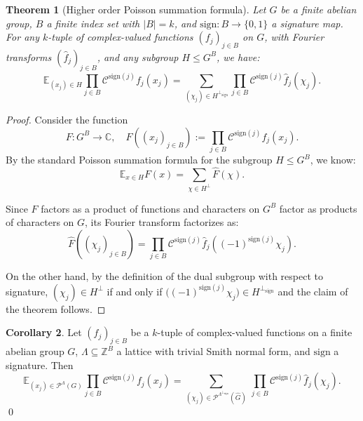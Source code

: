 \documentclass{amsart}
\newtheorem{theorem}{Theorem}[section]
\theoremstyle{definition}
\newtheorem{corollary}[theorem]{Corollary}
\theoremstyle{remark}
\numberwithin{equation}{section}
\begin{document}
\begin{theorem}[Higher order Poisson summation formula]
\label{thm:Poisson}
Let $G$ be a finite abelian group, $B$ a finite index set with $|B|=k$, and $\mathrm{sign}: B \to \{0,1\}$ a signature map. For any $k$-tuple of complex-valued functions $(f_j)_{j \in B}$ on $G$, with Fourier transforms $(\widehat{f}_j)_{j \in B}$, and any subgroup $H \leq G^B$, we have:
\begin{equation}
\label{Poisson}
\mathbb{E}_{(x_j) \in H} \prod_{j \in B} \mathcal{C}^{\mathrm{sign}(j)} f_j(x_j) = \sum_{(\chi_j) \in H^{\perp_{\mathrm{sign}}}} \prod_{j \in B} \mathcal{C}^{\mathrm{sign}(j)} \widehat{f}_j(\chi_j).
\end{equation}
\end{theorem}
\begin{proof}
Consider the function
$$
F: G^B \to \mathbb{C}, \quad F\left((x_j)_{j \in B}\right) := \prod_{j \in B} \mathcal{C}^{\mathrm{sign}(j)} f_j(x_j).
$$
By the standard Poisson summation formula for the subgroup $H \leq G^B$, we know:
$$
\mathbb{E}_{x \in H} F(x) = \sum_{\chi \in H^\perp} \widehat{F}(\chi).
$$

Since \(F\) factors as a product of functions and characters on \(G^B\) factor as products of characters on \(G\), its Fourier transform factorizes as:
\[
\widehat{F}\left((\chi_j)_{j \in B}\right) = \prod_{j \in B} \mathcal{C}^{\mathrm{sign}(j)} \widehat{f}_j\left((-1)^{\mathrm{sign}(j)} \chi_j\right).
\]

On the other hand, by the definition of the dual subgroup with respect to  signature, \((\chi_j) \in H^\perp\) if and only if \(\big((-1)^{\mathrm{sign}(j)} \chi_j\big) \in H^{\perp_{\mathrm{sign}}}\)
and the claim of the theorem follows.
\end{proof}


\begin{corollary}
\label{cor:Poisson} Let $(f_j)_{j \in B}$ be a $k$-tuple of complex-valued functions on a finite abelian group $G$, $\Lambda \subseteq \mathbb{Z}^B$  a lattice with trivial Smith normal form, and $\mathrm{sign}$ a signature.
 Then
\begin{equation}
\label{PoissonLattice}
     \mathbb{E}_{(x_j) \in \mathcal{P}^\Lambda(G)}  \prod_{j \in B}  \mathcal{C}^{\mathrm{sign}(j)} f_j(x_j) = \sum_{(\chi_j) \in \mathcal{P}^{\Lambda^{\perp_{\mathrm{sign}}}}(\widehat{G})} \, \prod_{j \in B}  \mathcal{C}^{\mathrm{sign}(j)} \widehat{f}_j(\chi_j). 
\end{equation}
\qed 
\end{corollary}
\end{document}
